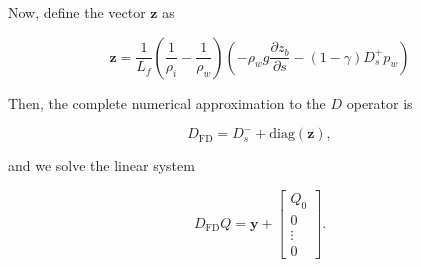\documentclass[11pt]{article}
\begin{document}
Now, define the vector $\mathbf{z}$ as
\begin{linenomath*}
\begin{equation}
\mathbf{z} = \frac{1}{L_f}\left(\frac{1}{\rho_i} - \frac{1}{\rho_w}\right)\left(-\rho_w g \frac{\partial z_b}{\partial s} - (1 - \gamma)D_s^+p_w \right)
\end{equation}
\end{linenomath*}
Then, the complete numerical approximation to the $D$ operator is
\begin{linenomath*}
\begin{equation}
D_{\textrm{FD}} = D_s^- + \textrm{diag}(\mathbf{z}),
\end{equation}
\end{linenomath*}
and we solve the linear system
\begin{linenomath*}
\begin{equation}
D_{\textrm{FD}}Q = \mathbf{y} + \begin{bmatrix} Q_0 \\ 0 \\ \vdots \\ 0 \end{bmatrix}.
\end{equation}
\end{linenomath*}
\end{document}
